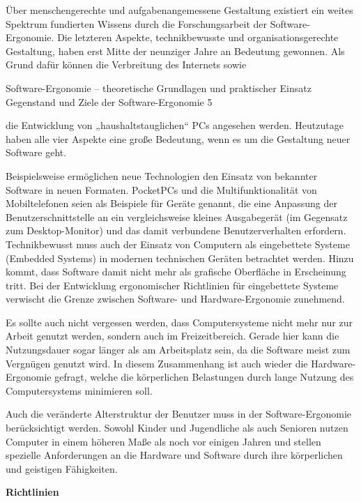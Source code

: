 \documentclass[a4paper, 12pt, twoside, BCOR=20mm, DIV=calc, abstracton, parskip=half*, toc=bibliography, toc=listof, headsepline, footsepline, headings=small, numbers=enddot]{scrreprt}
\begin{document}
	Über menschengerechte und aufgabenangemessene Gestaltung existiert ein weites Spektrum fundierten Wissens durch die Forschungsarbeit der Software-Ergonomie. Die letzteren Aspekte, technikbewusste und organisationsgerechte Gestaltung, haben erst Mitte der neunziger Jahre an Bedeutung gewonnen. Als Grund dafür können die Verbreitung des Internets sowie
	
	Software-Ergonomie – theoretische Grundlagen und praktischer Einsatz Gegenstand und Ziele der Software-Ergonomie 5
	
	die Entwicklung von „haushaltstauglichen“ PCs angesehen werden. Heutzutage haben alle vier Aspekte eine große Bedeutung, wenn es um die Gestaltung neuer Software geht.
	
	Beispielsweise ermöglichen neue Technologien den Einsatz von bekannter Software in neuen Formaten. PocketPCs und die Multifunktionalität von Mobiltelefonen seien als Beispiele für Geräte genannt, die eine Anpassung der Benutzerschnittstelle an ein vergleichsweise kleines Ausgabegerät (im Gegensatz zum Desktop-Monitor) und das damit verbundene Benutzerverhalten erfordern. Technikbewusst muss auch der Einsatz von Computern als eingebettete Systeme (Embedded Systems) in modernen technischen Geräten betrachtet werden. Hinzu kommt, dass Software damit nicht mehr als grafische Oberfläche in Erscheinung tritt. Bei der Entwicklung ergonomischer Richtlinien für eingebettete Systeme verwischt die Grenze zwischen Software- und Hardware-Ergonomie zunehmend.
	
	Es sollte auch nicht vergessen werden, dass Computersysteme nicht mehr nur zur Arbeit genutzt werden, sondern auch im Freizeitbereich. Gerade hier kann die Nutzungsdauer sogar länger als am Arbeitsplatz sein, da die Software meist zum Vergnügen genutzt wird. In diesem Zusammenhang ist auch wieder die Hardware-Ergonomie gefragt, welche die körperlichen Belastungen durch lange Nutzung des Computersystems minimieren soll.
	
	Auch die veränderte Alterstruktur der Benutzer muss in der Software-Ergonomie berücksichtigt werden. Sowohl Kinder und Jugendliche als auch Senioren nutzen Computer in einem höheren Maße als noch vor einigen Jahren und stellen spezielle Anforderungen an die Hardware und Software durch ihre körperlichen und geistigen Fähigkeiten.
	
	\textbf{Richtlinien }
	
\end{document}
